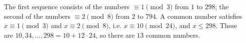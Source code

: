 The first sequence consists of the numbers $\equiv1\pmod3$ from $1$ to $298$; the second of the numbers $\equiv2\pmod8$ from $2$ to $794$. A common number satisfies $x\equiv1\pmod3$ and $x\equiv2\pmod8$, i.e. $x\equiv10\pmod{24}$, and $x\le298$. These are $10,34,\dots,298=10+12\cdot24$, so there are $\boxed{13}$ common numbers.
